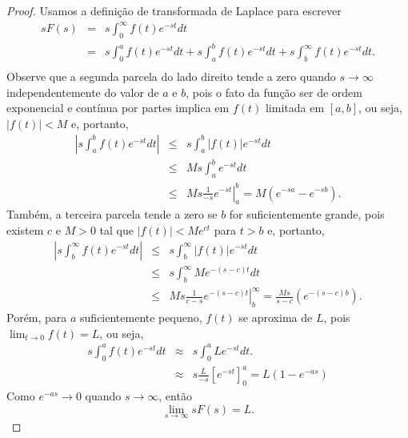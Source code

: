 \begin{proof}Usamos a definição de transformada de Laplace para escrever
\begin{eqnarray*}
sF(s)&=&s\int_0^\infty f(t)e^{-st}dt\\
&=&s\int_0^a f(t)e^{-st}dt+s\int_a^b f(t)e^{-st}dt+s\int_b^\infty f(t)e^{-st}dt.\\
\end{eqnarray*}
Observe que a segunda parcela do lado direito tende a zero quando $s\to \infty$ independentemente do valor de $a$ e $b$, pois o fato da função ser de ordem exponencial e contínua por partes implica em $f(t)$ limitada em $[a,b]$, ou seja, $|f(t)|<M$ e, portanto,
\begin{eqnarray*}
\left|s\int_a^b f(t)e^{-st}dt\right|&\leq & s\int_a^b |f(t)|e^{-st}dt\\
&\leq & Ms\int_a^b e^{-st}dt\\
&\leq & \left.Ms\frac{1}{-s} e^{-st}\right|_a^b=M(e^{-sa}-e^{-sb}).
\end{eqnarray*}
Também, a terceira parcela tende a zero se $b$ for suficientemente grande, pois existem $c$ e $M>0$ tal que $|f(t)|<Me^{ct}$ para $t>b$ e, portanto,
\begin{eqnarray*}
\left|s\int_b^\infty f(t)e^{-st}dt\right|&\leq & s\int_b^\infty |f(t)|e^{-st}dt\\
&\leq & s\int_b^\infty Me^{-(s-c)t}dt\\
&\leq & \left.Ms\frac{1}{c-s} e^{-(s-c)t}\right|_b^\infty=\frac{Ms}{s-c}(e^{-(s-c)b}).
\end{eqnarray*}
Porém, para $a$ suficientemente pequeno, $f(t)$ se aproxima de $L$, pois $\displaystyle \lim_{t\to 0}f(t)=L$, ou seja,
\begin{eqnarray*}
s\int_0^a f(t)e^{-st}dt &\approx &s\int_0^a L e^{-st}dt.\\
&\approx &s\frac{L}{-s}\left[ e^{-st}\right]_0^a=L\left(1-e^{-as}\right)
\end{eqnarray*}
Como $e^{-as}\to 0$ quando $s\to \infty$, então
\begin{equation}
\lim_{s\to \infty} sF(s)=L.
\end{equation} 
\end{proof}


